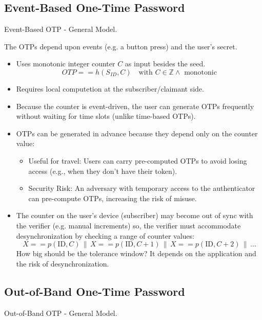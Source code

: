 \subsection{Event-Based One-Time Password}
\begin{center}
    Event-Based OTP - General Model.
\end{center}
The OTPs depend upon events (e.g. a button press) and the user's secret.
\begin{itemize}
    \item Uses monotonic integer counter $C$ as input besides the seed.
    \[
        \boxed{OTP = =h(S_{ID}, C)} \quad \text{with } C \in \mathbb{Z} \land\text { monotonic}
    \]
    \item Requires local computetion at the subscriber/claimant side.
    \item Because the counter is event-driven, the user can generate OTPs frequently without waiting for time slots (unlike time-based OTPs).
    \item OTPs can be generated in advance because they depend only on the counter value:
    \begin{itemize}
        \item Useful for travel: Users can carry pre-computed OTPs to avoid losing access (e.g., when they don't have their token).
        \item Security Risk: An adversary with temporary access to the authenticator can pre-compute OTPs, increasing the risk of misuse.
    \end{itemize}
    \item The counter on the user's device (subscriber) may become out of sync with the verifier (e.g. manual increments) so, the verifier must accommodate desynchronization by checking a range of counter values:
    \[
X == p(\text{ID}, C) \, \| \, X == p(\text{ID}, C+1) \, \| \, X == p(\text{ID},C+2) \, \| \, \dots
    \]
    How big should be the tolerance window? It depends on the application and the risk of desynchronization.
\end{itemize}

\subsection{Out-of-Band One-Time Password}
\begin{center}
    Out-of-Band OTP - General Model.
\end{center}

